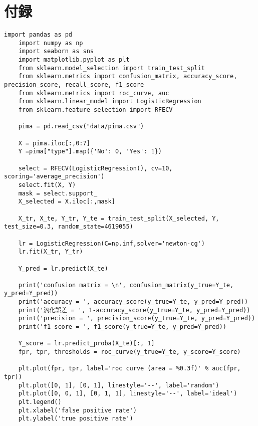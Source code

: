 \documentclass[12pt]{jarticle}
\begin{document}
\section{付録}
\begin{lstlisting}[style = py,caption=レポート課題1]
    import pandas as pd
    import numpy as np
    import seaborn as sns
    import matplotlib.pyplot as plt
    from sklearn.model_selection import train_test_split
    from sklearn.metrics import confusion_matrix, accuracy_score, precision_score, recall_score, f1_score
    from sklearn.metrics import roc_curve, auc
    from sklearn.linear_model import LogisticRegression
    from sklearn.feature_selection import RFECV
    
    pima = pd.read_csv("data/pima.csv")
    
    X = pima.iloc[:,0:7]
    Y =pima["type"].map({'No': 0, 'Yes': 1})
    
    select = RFECV(LogisticRegression(), cv=10, scoring='average_precision')
    select.fit(X, Y)
    mask = select.support_
    X_selected = X.iloc[:,mask]
    
    X_tr, X_te, Y_tr, Y_te = train_test_split(X_selected, Y, test_size=0.3, random_state=4619055)
    
    lr = LogisticRegression(C=np.inf,solver='newton-cg') 
    lr.fit(X_tr, Y_tr)
    
    Y_pred = lr.predict(X_te)
    
    print('confusion matrix = \n', confusion_matrix(y_true=Y_te, y_pred=Y_pred))
    print('accuracy = ', accuracy_score(y_true=Y_te, y_pred=Y_pred))
    print('汎化誤差 = ', 1-accuracy_score(y_true=Y_te, y_pred=Y_pred))
    print('precision = ', precision_score(y_true=Y_te, y_pred=Y_pred))
    print('f1 score = ', f1_score(y_true=Y_te, y_pred=Y_pred))
    
    Y_score = lr.predict_proba(X_te)[:, 1]
    fpr, tpr, thresholds = roc_curve(y_true=Y_te, y_score=Y_score)
    
    plt.plot(fpr, tpr, label='roc curve (area = %0.3f)' % auc(fpr, tpr))
    plt.plot([0, 1], [0, 1], linestyle='--', label='random')
    plt.plot([0, 0, 1], [0, 1, 1], linestyle='--', label='ideal')
    plt.legend()
    plt.xlabel('false positive rate')
    plt.ylabel('true positive rate')
\end{lstlisting}


\begin{lstlisting}[style = py,caption=レポート課題2]
 
\end{lstlisting}

\begin{lstlisting}[style = py,caption=レポート課題3]
 
\end{lstlisting}

\begin{lstlisting}[style = py,caption=レポート課題4]
 
\end{lstlisting}

\end{document}
